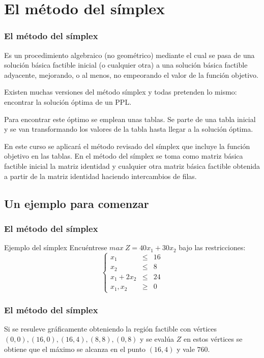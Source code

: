 \documentclass{beamer}
\begin{document}
\section{El m\'etodo del s\'implex}

\begin{frame}
\frametitle{El m\'etodo del s\'implex}

Es un procedimiento algebraico (no geom\'etrico) mediante el cual se pasa de una soluci\'on b\'asica factible inicial (o cualquier otra) a una soluci\'on b\'asica factible adyacente, mejorando, o al menos, no empeorando el valor de la funci\'on objetivo.

Existen muchas versiones del m\'etodo s\'implex y todas pretenden lo mismo: encontrar la soluci\'on \'optima de un PPL.

Para encontrar este \'optimo se emplean unas tablas. Se parte de una tabla inicial y se van transformando los valores de la tabla hasta llegar a la soluci\'on \'optima.

En este curso se aplicar\'a el m\'etodo revisado del s\'implex que incluye la funci\'on objetivo en las tablas. En el m\'etodo del s\'implex se toma como matriz b\'asica factible inicial la matriz identidad y cualquier otra matriz b\'asica factible obtenida a partir de la matriz identidad haciendo intercambios de filas.
\end{frame}

\subsection{Un ejemplo para comenzar}
\begin{frame}
\frametitle{El m\'etodo del s\'implex}
\begin{block}{Ejemplo del s\'implex}
Encu\'entrese $max\ Z = 40x_1+30x_2$ bajo las restricciones:
\[\left\{\begin{array}{ccc}x_1 & \leq & 16 \\x_2 & \leq & 8 \\x_1+2x_2 & \leq & 24 \\x_1,x_2 & \geq & 0\end{array}\right.\]
\end{block}
\end{frame}


\begin{frame}
\frametitle{El m\'etodo del s\'implex}
Si se resuleve gr\'aficamente obteniendo la regi\'on factible con v\'ertices $(0, 0), (16, 0), (16, 4), (8, 8), (0, 8)$ y se eval\'ua $Z$ en estos v\'ertices se obtiene que el m\'aximo se alcanza en el punto $(16, 4)$ y vale $760$.
\end{frame}
\end{document}

